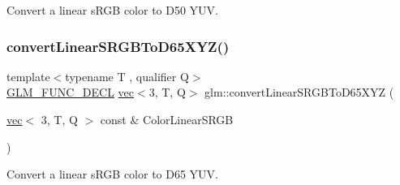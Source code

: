 Convert a linear s\+R\+GB color to D50 Y\+UV. 

\mbox{\label{group__gtx__color__encoding_gaf9e130d9d4ccf51cc99317de7449f369}} 
\subsubsection{\texorpdfstring{convert\+Linear\+S\+R\+G\+B\+To\+D65\+X\+Y\+Z()}{convertLinearSRGBToD65XYZ()}}
{\footnotesize\ttfamily template$<$typename T , qualifier Q$>$ \\
\hyperlink{setup_8hpp_ab2d052de21a70539923e9bcbf6e83a51}{G\+L\+M\+\_\+\+F\+U\+N\+C\+\_\+\+D\+E\+CL} \hyperlink{structglm_1_1vec}{vec}$<$3, T, Q$>$ glm\+::convert\+Linear\+S\+R\+G\+B\+To\+D65\+X\+YZ (\begin{DoxyParamCaption}\item[{\hyperlink{structglm_1_1vec}{vec}$<$ 3, T, Q $>$ const \&}]{Color\+Linear\+S\+R\+GB }\end{DoxyParamCaption})}



Convert a linear s\+R\+GB color to D65 Y\+UV. 

